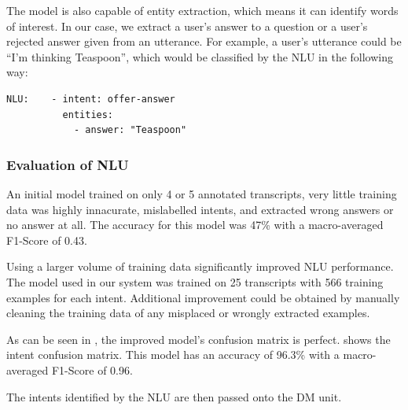 \documentclass[hidelinks, 11pt]{article}
\begin{document}
The model is also capable of entity extraction, which means it can identify words of interest. In our case, we extract a user's answer to a question or a user's rejected answer given from an utterance. For example, a user's utterance could be ``I'm thinking Teaspoon'', which would be classified by the NLU in the following way:

\begin{verbatim}
NLU:    - intent: offer-answer
          entities:
            - answer: "Teaspoon"
\end{verbatim}

\subsubsection{Evaluation of NLU}
\label{subsec:NLU_evaluation}

An initial model trained on only 4 or 5 annotated transcripts, very little training data was highly innacurate, mislabelled intents, and extracted wrong answers or no answer at all. The accuracy for this model was 47\% with a macro-averaged F1-Score of 0.43.

Using a larger volume of training data significantly improved NLU performance. The model used in our system was trained on 25 transcripts with 566 training examples for each intent. Additional improvement could be obtained by manually cleaning the training data of any misplaced or wrongly extracted examples.

As can be seen in , the improved model's confusion matrix is perfect.  shows the intent confusion matrix. This model has an accuracy of 96.3\% with a macro-averaged F1-Score of 0.96.

The intents identified by the NLU are then passed onto the DM unit.
\end{document}
